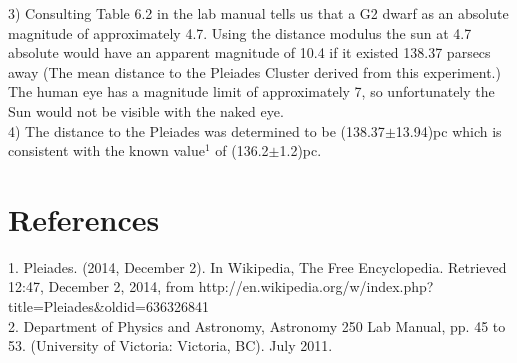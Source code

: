 \documentclass{article}
\begin{document}
3) Consulting Table 6.2 in the lab manual tells us that a G2 dwarf as an absolute magnitude of approximately 4.7. Using the distance modulus the sun at 4.7 absolute would have an apparent magnitude of 10.4 if it existed 138.37 parsecs away (The mean distance to the Pleiades Cluster derived from this experiment.) The human eye has a magnitude limit of approximately 7, so unfortunately the Sun would not be visible with the naked eye.\\

4) The distance to the Pleiades was determined to be (138.37$\pm$13.94)pc which is consistent with the known value$^1$ of (136.2$\pm$1.2)pc.
\section{References}
1. Pleiades. (2014, December 2). In Wikipedia, The Free Encyclopedia. Retrieved 12:47, December 2, 2014, from http://en.wikipedia.org/w/index.php?title=Pleiades\&oldid=636326841\\
2. Department of Physics and Astronomy, Astronomy 250 Lab Manual, pp. 45 to 53. (University of Victoria: Victoria, BC). July 2011.
\end{document}
